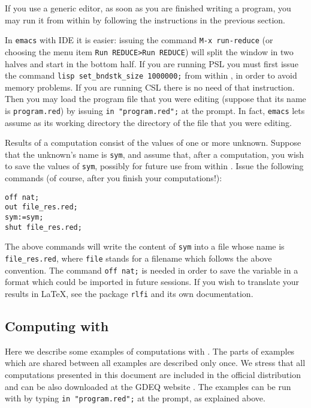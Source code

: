If you use a generic editor, as soon as you are finished writing a program, you
may run it from within \REDUCE by following the instructions in the previous
section.

In \texttt{emacs} with \REDUCE IDE it is easier: issuing the command
\texttt{M-x run-reduce} (or choosing the menu item \texttt{Run REDUCE>Run
  REDUCE}) will split the window in two halves and start \REDUCE in the bottom
half. If you are running PSL \REDUCE you must first issue the command
\texttt{lisp set\_bndstk\_size 1000000;} from within \REDUCE, in order to avoid
memory problems. If you are running CSL \REDUCE there is no need of that
instruction. Then you may load the program file that you were editing (suppose
that its name is \texttt{program.red}) by issuing \texttt{in "program.red";} at
the \REDUCE prompt. In fact, \texttt{emacs} lets \REDUCE assume as its working
directory the directory of the file that you were editing.

Results of a computation consist of the values of one or more unknown. Suppose
that the unknown's name is \texttt{sym}, and assume that, after a computation,
you wish to save the values of \texttt{sym}, possibly for future use from within
\REDUCE. Issue the following \REDUCE commands (of course, after you finish your
computations!):
\begin{verbatim}
off nat;
out file_res.red;
sym:=sym;
shut file_res.red;
\end{verbatim}
The above commands will write the content of \texttt{sym} into a file whose
name is \texttt{file\_res.red}, where \texttt{file} stands for a filename which
follows the above convention. The command \texttt{off nat;} is needed in order
to save the variable in a format which could be imported in future \REDUCE
sessions. If you wish to translate your results in \LaTeX, see the package
\texttt{rlfi} and its own documentation.

\subsection{Computing with \cdiff}

Here we describe some examples of computations with \cdiff. The parts of
examples which are shared between all examples are described only once. We
stress that all computations presented in this document are included in the
official \REDUCE distribution and can be also downloaded at the GDEQ website
\cite{gdeq}. The examples can be run with \REDUCE by typing \texttt{in
  "program.red";} at the \REDUCE prompt, as explained above.

